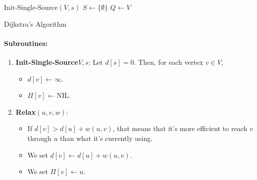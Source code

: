 \documentclass[a4paper,12pt]{report}
\begin{document}
\begin{algorithm}[H]
\SetAlgoLined
{}
	\BlankLine
	\BlankLine
	$\text{Init-Single-Source}(V, s)$\;
	$S\leftarrow \{\emptyset\}$\;
	$Q\leftarrow V$\;
	

	\caption{Dijkstra's Algorithm}
\end{algorithm}

\paragraph{Subroutines: } 
\begin{enumerate}
\item \textbf{Init-Single-Source}$V,s$: Let $d[s] = 0$. Then, for each vertex $v\in V$,
\begin{itemize}
\item $d[v] \leftarrow \infty$.
\item $\Pi[v] \leftarrow \text{NIL}$.
\end{itemize}

\item \textbf{Relax}$(u,v,w)$:
\begin{itemize}
\item If $d[v] > d[u] + w(u,v)$, that means that it's more efficient to reach $v$ through $u$ than what it's currently using.
\item We set $d[v] \leftarrow d[u] + w(u,v)$.
\item We set $\Pi[v] \leftarrow u$.
\end{itemize}




\end{enumerate}
\end{document}
